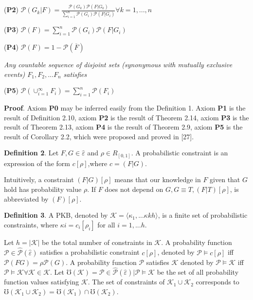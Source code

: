 \documentclass[10pt,a4paper]{IOS-Book-Article}
\begin{document}
(\textbf{P2}) $\mathcal{P}(G_k|F) = \frac{\mathcal{P}(G_k)\mathcal{P}(F|G_k)}{\sum_{i=1}^{n} \mathcal{P}(G_i)\mathcal{P}(F|G_i)} \forall k = 1, ..., n$

(\textbf{P3}) $\mathcal{P}(F) = \sum_{i=1}^{n} {\mathcal{P}(G_i)\mathcal{P}(F|G_i)}$

(\textbf{P4}) $\mathcal{P}(F) = 1 − \mathcal{P}(\overline F)$

\textit{Any countable sequence of disjoint sets (synonymous with mutually exclusive events) $F_1, F_2, ... F_n$ satisfies}

(\textbf{P5}) $\mathcal{P}(\cup_{i=1}^\infty F_i) = \sum_{i=1}^n \mathcal{P}(F_i)$

\textbf{Proof}. Axiom \textbf{P0} may be inferred easily from the Definition 1. Axiom \textbf{P1} is the result of Definition 2.10, axiom \textbf{P2} is the result of Theorem 2.14, axiom \textbf{P3} is the result of Theorem 2.13, axiom \textbf{P4} is the result of Theorem 2.9, axiom \textbf{P5} is the result of Corollary 2.2, which were proposed and proved in [27].

\textbf{Definition 2}. Let $F,G \in \hat{\varepsilon}$ and $\rho \in R_{[0,1]}$. A probabilistic constraint is an expression of the form $c[\rho]$,where $c = (F|G)$.

Intuitively, a constraint $(F|G)[\rho]$ means that our knowledge in $F$ given that $G$  hold has probability value $\rho$. If $F$ does not depend on $G,G \equiv T, (F|T)[\rho]$, is abbreviated by $(F)[\rho]$.

\textbf{Definition 3}. A PKB, denoted by $\mathcal{K} = \langle \kappa_1, ... \kappa kh \rangle$, is a finite set of probabilistic constraints, where $\kappa i = c_i[\rho_i]$ for all $i = 1, ... h$. 

Let $h = |\mathcal{K}|$ be the total number of constraints in $\mathcal{K}$. A probability function $\mathcal{P} \in \hat{\mathcal{P}} (\hat{\varepsilon})$ satisfies a probabilistic constraint $c[\rho]$, denoted by $\mathcal{P} \models c[\rho]$ iff $\mathcal{P}(FG) = \rho\mathcal{P}(G)$. A probability function $\mathcal{P}$ satisfies $\mathcal{K}$ denoted by $\mathcal{P} \models \mathcal{K}$ iff $\mathcal{P} \models \mathcal{K}\forall \mathcal{K} \in \mathcal{K}$. Let $\mho (\mathcal{K}) = {\mathcal{P} \in \hat{\mathcal{P}} (\hat{\varepsilon})|\mathcal{P} \models \mathcal{K}}$ be the set of all probability function values satisfying $\mathcal{K}$. The set of constraints of $\mathcal{K}_1 \cup \mathcal{K}_2$ corresponds to $\mho(\mathcal{K}_1 \cup \mathcal{K}_2) = \mho(\mathcal{K}_1) \cap \mho (\mathcal{K}_2)$.
\end{document}
